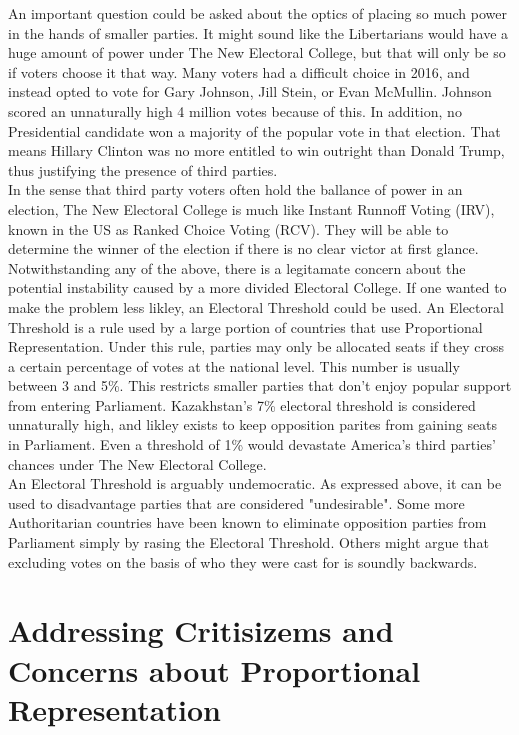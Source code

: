 \documentclass{article}
\begin{document}
    An important question could be asked about the optics of placing so much power in the hands of smaller parties. It might sound like the Libertarians would have a huge amount of power under The New Electoral College, but that will only be so if voters choose it that way. Many voters had a difficult choice in 2016, and instead opted to vote for Gary Johnson, Jill Stein, or Evan McMullin. Johnson scored an unnaturally high 4 million votes because of this. In addition, no Presidential candidate won a majority of the popular vote in that election. That means Hillary Clinton was no more entitled to win outright than Donald Trump, thus justifying the presence of third parties.\\

    In the sense that third party voters often hold the ballance of power in an election, The New Electoral College is much like Instant Runnoff Voting (IRV), known in the US as Ranked Choice Voting (RCV). They will be able to determine the winner of the election if there is no clear victor at first glance.\\

    Notwithstanding any of the above, there is a legitamate concern about the potential instability caused by a more divided Electoral College. If one wanted to make the problem less likley, an Electoral Threshold could be used. An Electoral Threshold is a rule used by a large portion of countries that use Proportional Representation. Under this rule, parties may only be allocated seats if they cross a certain percentage of votes at the national level. This number is usually between 3 and 5\%. This restricts smaller parties that don't enjoy popular support from entering Parliament. Kazakhstan's 7\% electoral threshold is considered unnaturally high, and likley exists to keep opposition parites from gaining seats in Parliament. Even a threshold of 1\% would devastate America's third parties' chances under The New Electoral College.\\

    An Electoral Threshold is arguably undemocratic. As expressed above, it can be used to disadvantage parties that are considered "undesirable". Some more Authoritarian countries have been known to eliminate opposition parties from Parliament simply by rasing the Electoral Threshold. Others might argue that excluding votes on the basis of who they were cast for is soundly backwards.\\

    \section{Addressing Critisizems and Concerns about Proportional Representation}%
\end{document}
